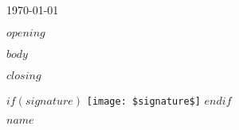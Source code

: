 \documentclass[10pt, a4paper]{article}
\begin{document}
\makeprofile %

\makecontact %

\today %


$opening$

$body$





$closing$


$if(signature)$
\texttt{[image: \$signature\$]}
$endif$

$name$
\end{document}
